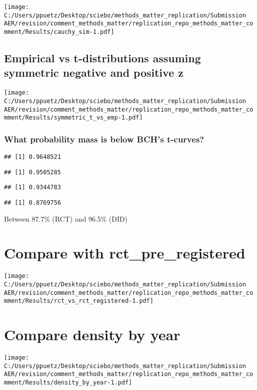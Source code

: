 \documentclass[
]{article}
\begin{document}
\texttt{[image: C:/Users/ppuetz/Desktop/sciebo/methods\_matter\_replication/Submission AER/revision/comment\_methods\_matter/replication\_repo\_methods\_matter\_comment/Results/cauchy\_sim-1.pdf]}

\hypertarget{empirical-vs-t-distributions-assuming-symmetric-negative-and-positive-z}{%
\subsection{Empirical vs t-distributions assuming symmetric negative and
positive
z}\label{empirical-vs-t-distributions-assuming-symmetric-negative-and-positive-z}}

\texttt{[image: C:/Users/ppuetz/Desktop/sciebo/methods\_matter\_replication/Submission AER/revision/comment\_methods\_matter/replication\_repo\_methods\_matter\_comment/Results/symmetric\_t\_vs\_emp-1.pdf]}

\hypertarget{what-probability-mass-is-below-bchs-t-curves}{%
\subsubsection{What probability mass is below BCH's
t-curves?}\label{what-probability-mass-is-below-bchs-t-curves}}

\begin{verbatim}
## [1] 0.9648521
\end{verbatim}

\begin{verbatim}
## [1] 0.9505285
\end{verbatim}

\begin{verbatim}
## [1] 0.9344783
\end{verbatim}

\begin{verbatim}
## [1] 0.8769756
\end{verbatim}

Between 87.7\% (RCT) and 96.5\% (DID)

\hypertarget{compare-with-rct_pre_registered}{%
\section{Compare with
rct\_pre\_registered}\label{compare-with-rct_pre_registered}}

\texttt{[image: C:/Users/ppuetz/Desktop/sciebo/methods\_matter\_replication/Submission AER/revision/comment\_methods\_matter/replication\_repo\_methods\_matter\_comment/Results/rct\_vs\_rct\_registered-1.pdf]}

\hypertarget{compare-density-by-year}{%
\section{Compare density by year}\label{compare-density-by-year}}

\texttt{[image: C:/Users/ppuetz/Desktop/sciebo/methods\_matter\_replication/Submission AER/revision/comment\_methods\_matter/replication\_repo\_methods\_matter\_comment/Results/density\_by\_year-1.pdf]}
\end{document}

